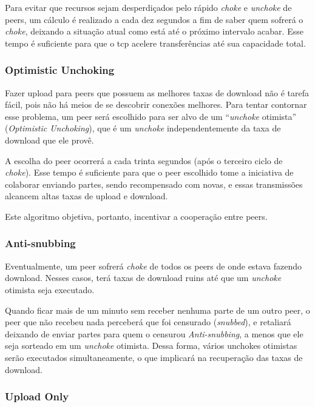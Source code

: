 Para evitar que recursos sejam desperdiçados pelo rápido \emph{choke} e \emph{unchoke}
de \glspl*{peer}, um cálculo é realizado a cada dez segundos a fim de saber quem
sofrerá o \emph{choke}, deixando a situação atual como está até o próximo intervalo
acabar. Esse tempo é suficiente para que o \gls*{tcp} acelere transferências até sua
capacidade total.

\subsubsection*{Optimistic Unchoking}

Fazer upload para \glspl*{peer} que possuem as melhores taxas de download não é tarefa
fácil, pois não há meios de se descobrir conexões melhores. Para tentar contornar esse
problema, um \gls*{peer} será escolhido para ser alvo de um ``\emph{unchoke} otimista''
(\emph{Optimistic Unchoking}), que é um \emph{unchoke} independentemente da taxa de
download que ele provê.

A escolha do \gls*{peer} ocorrerá a cada trinta segundos (após o terceiro ciclo de
\emph{choke}). Esse tempo é suficiente para que o \gls*{peer} escolhido tome a
iniciativa de colaborar enviando partes, sendo recompensado com novas, e essas
transmissões alcancem altas taxas de upload e download.

Este algoritmo objetiva, portanto, incentivar a cooperação entre \glspl*{peer}.

\subsubsection*{Anti-snubbing}

Eventualmente, um \gls*{peer} sofrerá \emph{choke} de todos os \glspl*{peer} de onde
estava fazendo download. Nesses casos, terá taxas de download ruins até que um
\emph{unchoke} otimista seja executado.

Quando ficar mais de um minuto sem receber nenhuma parte de um outro \gls*{peer}, o
\gls*{peer} que não recebeu nada perceberá que foi censurado (\emph{snubbed}), e
retaliará deixando de enviar partes para quem o censurou \emph{Anti-snubbing}, a menos
que ele seja sorteado em um \emph{unchoke} otimista. Dessa forma, vários unchokes
otimistas serão executados simultaneamente, o que implicará na recuperação das taxas de
download.

\subsubsection*{Upload Only}

